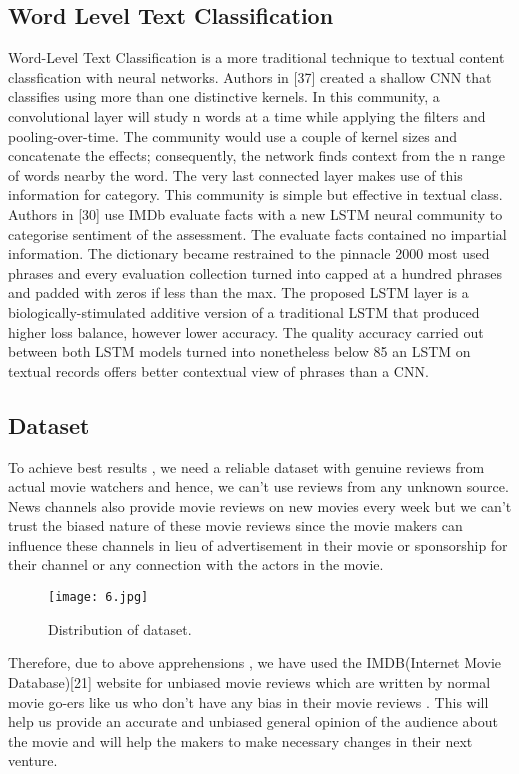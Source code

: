 \documentclass[conference]{IEEEtran}
\begin{document}
\subsection{Word Level Text Classification}\label{AA}

Word-Level Text Classification is a more traditional
technique to textual content classfication with neural networks. Authors in
[37] created a shallow CNN that classifies using more than one
distinctive kernels. In this community, a convolutional layer will
study n words at a time while applying the filters and
pooling-over-time. The community would use a couple of kernel
sizes and concatenate the effects; consequently, the network finds
context from the n range of words nearby the word. The
very last connected layer makes use of this information for category.
This community is simple but effective in textual class.
Authors in [30] use IMDb evaluate facts with a new LSTM
neural community to categorise sentiment of the assessment. The evaluate
facts contained no impartial information. The dictionary became restrained to
the pinnacle 2000 most used phrases and every evaluation collection turned into
capped at a hundred phrases and padded with zeros if less than the
max. The proposed LSTM layer is a biologically-stimulated
additive version of a traditional LSTM that produced higher
loss balance, however lower accuracy. The quality accuracy carried out
between both LSTM models turned into nonetheless below 85%
an LSTM on textual records offers better contextual view of
phrases than a CNN.


\subsection{Dataset}
To achieve best results , we need a reliable dataset with genuine reviews from actual movie watchers and hence, we can't use reviews from any unknown source. News channels also provide movie reviews on new movies every week but we can't trust the biased nature of these movie reviews since the movie makers can influence these channels in lieu of advertisement in their movie or sponsorship for their channel or any connection with the actors in the movie.

\begin{figure}[htbp]
\centerline{\texttt{[image: 6.jpg]}}
\caption{Distribution of dataset.}
\label{fig}
\end{figure}

Therefore, due to above apprehensions , we have used the IMDB(Internet Movie Database)[21] website for unbiased movie reviews which are written by normal movie go-ers like us who don't have any bias in their movie reviews . This will help us provide an accurate and unbiased general opinion of the audience about the movie and will help the makers to make necessary changes in their next venture.
\end{document}
